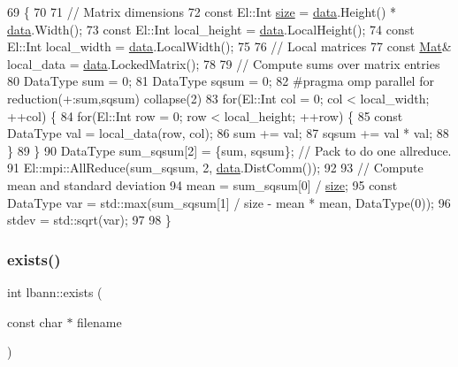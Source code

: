 \begin{DoxyCode}
69                                                \{
70 
71   \textcolor{comment}{// Matrix dimensions}
72   \textcolor{keyword}{const} El::Int \hyperlink{structc__hash__table_afd5bfd9640fc5b72f75457fb7dd89663}{size} = \hyperlink{namespacelbann_1_1cnpy__utils_a9ac86d96ccb1f8b4b2ea16441738781f}{data}.Height() * \hyperlink{namespacelbann_1_1cnpy__utils_a9ac86d96ccb1f8b4b2ea16441738781f}{data}.Width();
73   \textcolor{keyword}{const} El::Int local\_height = \hyperlink{namespacelbann_1_1cnpy__utils_a9ac86d96ccb1f8b4b2ea16441738781f}{data}.LocalHeight();
74   \textcolor{keyword}{const} El::Int local\_width = \hyperlink{namespacelbann_1_1cnpy__utils_a9ac86d96ccb1f8b4b2ea16441738781f}{data}.LocalWidth();
75 
76   \textcolor{comment}{// Local matrices}
77   \textcolor{keyword}{const} \hyperlink{base_8hpp_a68f11fdc31b62516cb310831bbe54d73}{Mat}& local\_data = \hyperlink{namespacelbann_1_1cnpy__utils_a9ac86d96ccb1f8b4b2ea16441738781f}{data}.LockedMatrix();
78 
79   \textcolor{comment}{// Compute sums over matrix entries}
80   DataType sum = 0;
81   DataType sqsum = 0;
82 \textcolor{preprocessor}{  #pragma omp parallel for reduction(+:sum,sqsum) collapse(2)}
83   \textcolor{keywordflow}{for}(El::Int col = 0; col < local\_width; ++col) \{
84     \textcolor{keywordflow}{for}(El::Int row = 0; row < local\_height; ++row) \{
85       \textcolor{keyword}{const} DataType val = local\_data(row, col);
86       sum += val;
87       sqsum += val * val;
88     \}
89   \}
90   DataType sum\_sqsum[2] = \{sum, sqsum\};  \textcolor{comment}{// Pack to do one allreduce.}
91   El::mpi::AllReduce(sum\_sqsum, 2, \hyperlink{namespacelbann_1_1cnpy__utils_a9ac86d96ccb1f8b4b2ea16441738781f}{data}.DistComm());
92 
93   \textcolor{comment}{// Compute mean and standard deviation}
94   mean = sum\_sqsum[0] / \hyperlink{structc__hash__table_afd5bfd9640fc5b72f75457fb7dd89663}{size};
95   \textcolor{keyword}{const} DataType var = std::max(sum\_sqsum[1] / size - mean * mean, DataType(0));
96   stdev = std::sqrt(var);
97 
98 \}
\end{DoxyCode}
\mbox{\label{namespacelbann_aefae2a9fc9d742ece0fa8ca7ed9ee137}} 
\subsubsection{\texorpdfstring{exists()}{exists()}}
{\footnotesize\ttfamily int lbann\+::exists (\begin{DoxyParamCaption}\item[{const char $\ast$}]{filename }\end{DoxyParamCaption})}




